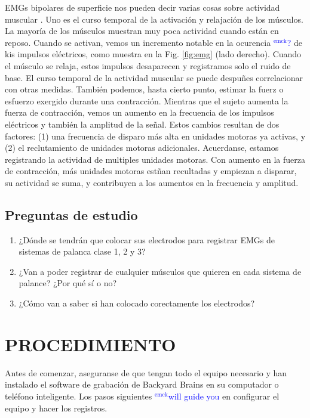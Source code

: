 \documentclass[12pt]{article}
\newcommand{\emck}[1]{\textcolor{blue}{$^{\textrm{emck}}${#1}}}
\begin{document}
EMGs bipolares de superficie nos pueden decir varias cosas sobre
actividad muscular \cite{garcia2011surface}. Uno es el curso temporal
de la activación y relajación de los músculos. La mayoría de los
músculos muestran muy poca actividad cuando están en reposo. Cuando se
activan, vemos un incremento notable en la ocurencia \emck{?} de kis
impulsos eléctricos, como muestra en la Fig. \ref{fig:emg} (lado
derecho). Cuando el músculo se relaja, estos impulsos desaparecen y
registramos solo el ruido de base. El curso temporal de la actividad
muscular se puede despuñes correlacionar con otras medidas. También
podemos, hasta cierto punto, estimar la fuerz o esfuerzo exergido
durante una contracción. Mientras que el sujeto aumenta la fuerza de
contracción, vemos un aumento en la frecuencia de los impulsos
eléctricos y también la amplitud de la señal. Estos cambios resultan
de dos factores: (1) una frecuencia de disparo más alta en unidades
motoras ya activas, y (2) el reclutamiento de unidades motoras
adicionales. Acuerdanse, estamos registrando la actividad de multiples
unidades motoras. Con aumento en la fuerza de contracción, más
unidades motoras estñan recultadas y empiezan a disparar, su actividad
se suma, y contribuyen a los aumentos en la frecuencia y amplitud.

\subsection*{Preguntas de estudio} 
\begin{enumerate}
\item ¿Dónde se tendrán que colocar sus electrodos para registrar EMGs
  de sistemas de palanca clase 1, 2 y 3?
\item ¿Van a poder registrar de cualquier músculos que quieren en cada
  sistema de palance? ¿Por qué sí o no?
\item ¿Cómo van a saber si han colocado corectamente los electrodos?
\end{enumerate}

\section*{PROCEDIMIENTO}

Antes de comenzar, aseguranse de que tengan todo el equipo necesario y
han instalado el software de grabación de Backyard Brains en su
computador o teléfono inteligente. Los pasos siguientes \emck{will
  guide you} en configurar el equipo y hacer los registros.
\end{document}
